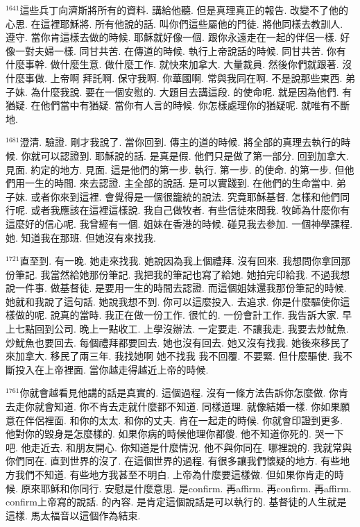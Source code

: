\documentclass{book}
\begin{document}
$^{1641}$這些兵丁向濟斯將所有的資料.
講給他聽.
但是真理真正的報告.
改變不了他的心思.
在這裡耶穌將.
所有他說的話.
叫你們這些屬他的門徒.
將他同樣去教訓人.
遵守.
當你肯這樣去做的時候.
耶穌就好像一個.
跟你永遠走在一起的伴侶一樣.
好像一對夫婦一樣.
同甘共苦.
在傳道的時候.
執行上帝說話的時候.
同甘共苦.
你有什麼事幹.
做什麼生意.
做什麼工作.
就快來加拿大.
大量裁員.
然後你們就跟著.
沒什麼事做.
上帝啊 拜託啊.
保守我啊.
你華國啊.
常與我同在啊.
不是說那些東西.
弟子妹.
為什麼我說.
要在一個安慰的.
大題目去講這段.
的使命呢.
就是因為他們.
有猶疑.
在他們當中有猶疑.
當你有人言的時候.
你怎樣處理你的猶疑呢.
就唯有不斷地.

$^{1681}$澄清.
驗證.
剛才我說了.
當你回到.
傳主的道的時候.
將全部的真理去執行的時候.
你就可以認證到.
耶穌說的話.
是真是假.
他們只是做了第一部分.
回到加拿大.
見面.
約定的地方.
見面.
這是他們的第一步.
執行.
第一步.
的使命.
的第一步.
但他們用一生的時間.
來去認證.
主全部的說話.
是可以實踐到.
在他們的生命當中.
弟子妹.
或者你來到這裡.
會覺得是一個很籠統的說法.
究竟耶穌基督.
怎樣和他們同行呢.
或者我應該在這裡這樣說.
我自己做牧者.
有些信徒來問我.
牧師為什麼你有這麼好的信心呢.
我曾經有一個.
姐妹在香港的時候.
碰見我去參加.
一個神學課程.
她.
知道我在那班.
但她沒有來找我.

$^{1721}$直至到.
有一晚.
她走來找我.
她說因為我上個禮拜.
沒有回來.
我想問你拿回那份筆記.
我當然給她那份筆記.
我把我的筆記也寫了給她.
她拍完印給我.
不過我想說一件事.
做基督徒.
是要用一生的時間去認證.
而這個姐妹還我那份筆記的時候.
她就和我說了這句話.
她說我想不到.
你可以這麼投入.
去追求.
你是什麼驅使你這樣做的呢.
說真的當時.
我正在做一份工作.
很忙的.
一份會計工作.
我告訴大家.
早上七點回到公司.
晚上一點收工.
上學沒辦法.
一定要走.
不讓我走.
我要去炒魷魚.
炒魷魚也要回去.
每個禮拜都要回去.
她也沒有回去.
她又沒有找我.
她後來移民了來加拿大.
移民了兩三年.
我找她啊 她不找我 我不回覆.
不要緊.
但什麼驅使.
我不斷投入在上帝裡面.
當你越走得越近上帝的時候.

$^{1761}$你就會越看見他講的話是真實的.
這個過程.
沒有一條方法告訴你怎麼做.
你肯去走你就會知道.
你不肯去走就什麼都不知道.
同樣道理.
就像結婚一樣.
你如果願意在伴侶裡面.
和你的太太.
和你的丈夫.
肯在一起走的時候.
你就會印證到更多.
他對你的毀身是怎麼樣的.
如果你病的時候他理你都傻.
他不知道你死的.
哭一下吧.
他走近去.
和朋友開心.
你知道是什麼情況.
他不與你同在.
哪裡說的.
我就常與你們同在.
直到世界的沒了.
在這個世界的過程.
有很多讓我們懷疑的地方.
有些地方我們不知道.
有些地方我甚至不明白.
上帝為什麼要這樣做.
但如果你肯走的時候.
原來耶穌和你同行.
安慰是什麼意思.
是confirm.
再affirm.
再confirm.
再affirm.
confirm上帝寫的說話.
的內容.
是肯定這個說話是可以執行的.
基督徒的人生就是這樣.
馬太福音以這個作為結束.
\end{document}
